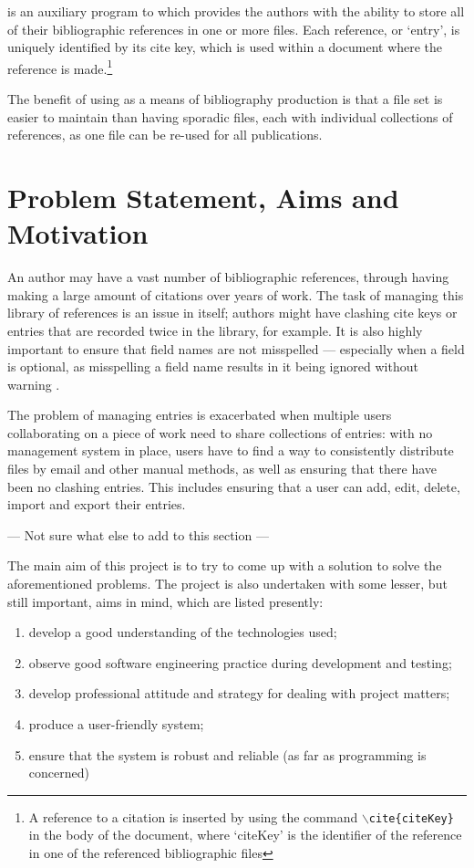 \bibtex{} is an auxiliary program to \latex which provides the authors with the ability to store all of their bibliographic references in one or more files.  Each reference, or `entry', is uniquely identified by its cite key, which is used within a document where the reference is made.\footnote{A reference to a citation is inserted by using the \latex command \texttt{$\backslash$cite\{citeKey\}} in the body of the document, where `citeKey' is the identifier of the reference in one of the referenced bibliographic files}

The benefit of using \bibtex{} as a means of bibliography production is that a file set is easier to maintain than having sporadic files, each with individual collections of references, as one file can be re-used for all publications.

\section{Problem Statement, Aims and Motivation}
An author may have a vast number of bibliographic references, through having making a large amount of citations over years of work.  The task of managing this library of references is an issue in itself; authors might have clashing cite keys or entries that are recorded twice in the library, for example.  It is also highly important to ensure that field names are not misspelled --- especially when a field is optional, as misspelling a field name results in it being ignored without warning \cite{OP88}.

The problem of managing entries is exacerbated when multiple users collaborating on a piece of work need to share collections of entries: with no management system in place, users have to find a way to consistently distribute files by email and other manual methods, as well as ensuring that there have been no clashing entries.  This includes ensuring that a user can add, edit, delete, import and export their entries.

\revisit --- Not sure what else to add to this section --- \revisit

The main aim of this project is to try to come up with a solution to solve the aforementioned problems.  The project is also undertaken with some lesser, but still important, aims in mind, which are listed presently:
\begin{enumerate}
\item develop a good understanding of the technologies used;
\item observe good software engineering practice during development and testing;
\item develop professional attitude and strategy for dealing with project matters;
\item produce a user-friendly system;
\item ensure that the system is robust and reliable (as far as programming is concerned)
\end{enumerate}


